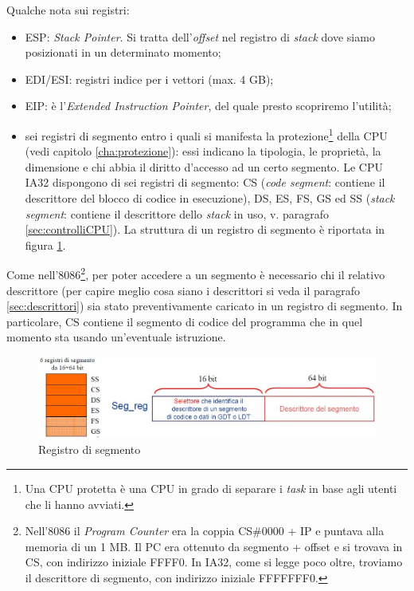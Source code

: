 Qualche nota sui registri:
\begin{itemize}
\item ESP: \textit{Stack Pointer}. Si tratta dell'\textit{offset} nel registro di \textit{stack} dove siamo posizionati in un determinato momento;
\item EDI/ESI: registri indice per i vettori (max. 4 GB);
\item EIP: è l'\textit{Extended Instruction Pointer}, del quale presto scopriremo l'utilità;
\item sei registri di segmento entro i quali si manifesta la protezione\footnote{Una CPU protetta è una CPU in grado di separare i \textit{task} in base agli utenti che li hanno avviati.} della CPU (vedi capitolo \ref{cha:protezione}): essi indicano la tipologia, le proprietà, la dimensione e chi abbia il diritto d'accesso ad un certo segmento. Le CPU IA32 dispongono di sei registri di segmento: CS (\textit{code segment}: contiene il descrittore del blocco di codice in esecuzione), DS, ES, FS, GS ed SS (\textit{stack segment}: contiene il descrittore dello \textit{stack} in uso, v. paragrafo \ref{sec:controlliCPU}). La struttura di un registro di segmento è riportata in figura \ref{fig:regSegmento}.
\end{itemize}

Come nell'8086\footnote{Nell'8086 il \textit{Program Counter} era la coppia CS\#0000 + IP e puntava alla memoria di un 1 MB. Il PC era ottenuto da segmento + offset e si trovava in CS, con indirizzo iniziale FFFF0. In IA32, come si legge poco oltre, troviamo il descrittore di segmento, con indirizzo iniziale FFFFFFF0.}, per poter accedere a un segmento è necessario chi il relativo descrittore (per capire meglio cosa siano i descrittori si veda il paragrafo \ref{sec:descrittori}) sia stato preventivamente caricato in un registro di segmento. In particolare, CS contiene il segmento di codice del programma che in quel momento sta usando un'eventuale istruzione.

\begin{figure}[!h]
\centering
\includegraphics[width=0.84\columnwidth]{img/regSegmento}
\caption{Registro di segmento}
\label{fig:regSegmento}
\end{figure}

